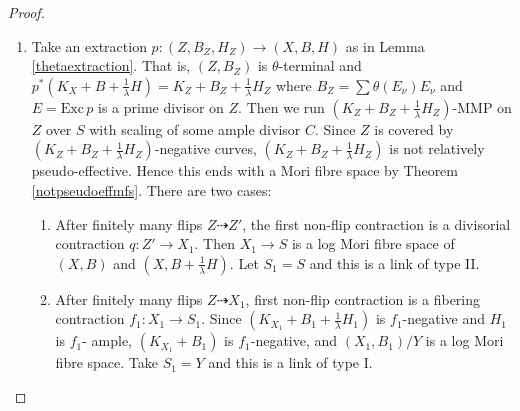 \documentclass{article}
\begin{document}
\begin{proof}
\begin{enumerate}[A]
\begin{enumerate}[1]
  \end{enumerate}
\item\label{b}Take  an extraction $ p:(Z,B_Z,H_Z)\to (X,B,H) $ as in Lemma \ref{thetaextraction}. That is,  $ (Z,B_Z) $ is $ \theta $-terminal and $ p^*(K_X+B+\frac{1}{\lambda}H)=K_Z+B_Z+\frac{1}{\lambda}H_Z $ where $ B_Z=\sum\theta(E_\nu)E_\nu $ and $ E=\mathrm{Exc}\,p $ is a prime divisor on $ Z $.
  Then we run $ (K_Z+B_Z+\frac{1}{\lambda}H_Z) $-MMP on $ Z $ over $ S $ with scaling of some ample divisor $C$. Since $Z$ is covered by $ (K_Z+B_Z+\frac{1}{\lambda}H_Z) $-negative curves, $ (K_Z+B_Z+\frac{1}{\lambda}H_Z) $ is not relatively pseudo-effective. Hence this  ends with a Mori fibre space by Theorem \ref{notpseudoeffmfs}. There are two cases:
  \begin{enumerate}[1]
    \item \label{b1}After finitely many flips $ Z\dashrightarrow Z' $, the first non-flip contraction is a divisorial contraction $ q:Z'\to X_1 $. Then $ X_{1}\to S $ is a log Mori fibre space of $(X,B)$ and $(X,B+\frac{1}{\lambda}H)$.  Let $ S_1=S $ and this is a link of type II.
    \item\label{b2}After finitely many flips $ Z\dashrightarrow X_1 $, first non-flip contraction is a fibering contraction $ f_1:X_1\to S_{1}$. Since $ (K_{X_1}+B_1+\frac{1}{\lambda}H_1) $ is $ f_1 $-negative and $ H_1 $ is $ f_1 $- ample, $ (K_{X_1}+B_1) $ is $ f_1 $-negative, and $ (X_1,B_1)/Y $ is a log Mori fibre space.  Take $ S_1=Y $ and this is a link of type I.
  \end{enumerate} 
\end{enumerate}
\end{proof}
\end{document}
